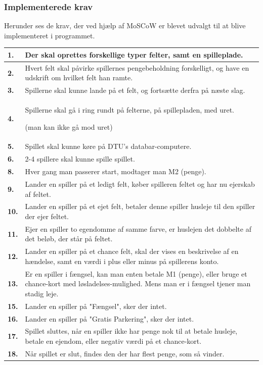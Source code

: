     \pagebreak
\subsubsection{Implementerede krav}

Herunder ses de krav, der ved hjælp af MoSCoW er blevet udvalgt til at blive implementeret i programmet. \\

\begin{tabular}{| l |p{13cm}|}

    \hline
    \textbf{1.} 
    &
    Der skal oprettes forskellige typer felter, samt en spilleplade. \\
    \hline
    \textbf{2.} 
    &
    Hvert felt skal påvirke spillernes pengebeholdning forskelligt, og have en udskrift om hvilket felt han ramte. \\
    \hline
    \textbf{3.} 
    &
    Spillerne skal kunne lande på et felt, og fortsætte derfra på næste slag. \\
    \hline
    \textbf{4.} 
    &
    Spillerne skal gå i ring rundt på felterne, på spillepladen, med uret. 
    
    (man kan ikke gå mod uret) \\
    \hline
    \textbf{5.} 
    &
    Spillet skal kunne køre på DTU’s databar-computere. \\
    \hline
    \textbf{6.} 
    &
    2-4 spillere skal kunne spille spillet. \\
    \hline
    \textbf{8.}
    &
    Hver gang man passerer start, modtager man M2 (penge). \\
    \hline
    \textbf{9.}
    &
    Lander en spiller på et ledigt felt, køber spilleren feltet og har nu ejerskab af feltet. \\
    \hline
    \textbf{10.}
    &
    Lander en spiller på et ejet felt, betaler denne spiller husleje til den spiller der ejer feltet. \\
    \hline
    \textbf{11.}
    &
    Ejer en spiller to egendomme af samme farve, er huslejen det dobbelte af det beløb, der står på feltet. \\
    \hline
    \textbf{12.}
    &
    Lander en spiller på et chance felt, skal der vises en beskrivelse af en hændelse, samt en værdi i plus eller minus på spillerens konto. \\
    \hline
    \textbf{13.}
    &
    Er en spiller i fængsel, kan man enten betale M1 (penge), eller bruge et chance-kort med løsladelses-mulighed. Mens man er i fængsel tjener man stadig leje. \\
    \hline
    \textbf{15.}
    &
    Lander en spiller på "Fængsel", sker der intet. \\
    \hline
    \textbf{16.}
    &
    Lander en spiller på "Gratis Parkering", sker der intet. \\
    \hline
    \textbf{17.}
    &
    Spillet sluttes, når en spiller ikke har penge nok til at betale husleje, betale en ejendom, eller negativ værdi på et chance-kort. \\
    \hline
    \textbf{18.}
    &
    Når spillet er slut, findes den der har flest penge, som så vinder. 
    

\end{tabular}
